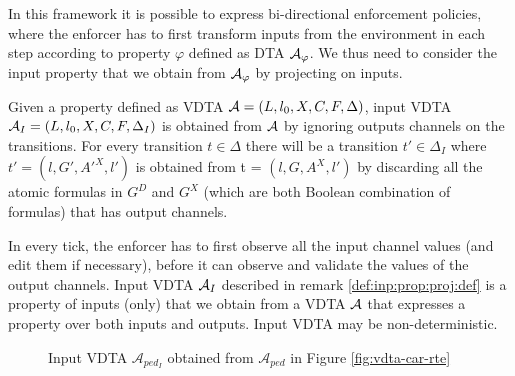 In this framework it is possible to express bi-directional enforcement policies, where
the enforcer has to first transform inputs from the environment in each step according to property $\varphi$ defined as DTA ${\mathcal A}_\varphi$.
We thus need to consider the input property that we obtain from ${\mathcal A}_\varphi$ by projecting on inputs.

\begin{remark}
	\label{def:inp:prop:proj:def}
	Given a property defined as \ac{VDTA} ${\mathcal A}=\left(L, {l_0}, X, C,  F,  \Delta \right)$, input \ac{VDTA} ${\mathcal A}_{I}=\left(L, {l_0}, X,  C,  F,  \Delta_I \right)$ is obtained from ${\mathcal A}$ by ignoring outputs channels on the transitions. For every transition $t \in \Delta$ there will be a transition $t' \in \Delta_I$ where $t' = \left( l, G', A'^X, l' \right)$ is obtained from t = $\left( l, G, A^X, l' \right)$ by discarding all the atomic formulas in $G^{D}$ and $G^{X}$ (which are both Boolean combination of formulas) that has output channels.
	\end{remark}
%




In every tick, the enforcer has to first observe all the input channel values (and edit them if necessary), before it can observe and validate the values of the output channels.  
Input VDTA ${\mathcal A}_I$  described in remark \ref{def:inp:prop:proj:def} is a property of inputs (only) that we obtain from a VDTA ${\mathcal A}$ that expresses a property over both inputs and outputs. 
Input \ac{VDTA} may be non-deterministic.


\begin{figure}[tb]
	\centering
	
	\caption{Input VDTA $\mathcal{A}_{ped_I}$ obtained from $\mathcal{A}_{ped}$ in Figure \ref{fig:vdta-car-rte}}
	\label{fig:inp-vdta-car-rte}
	\vspace{-5mm}
\end{figure}

